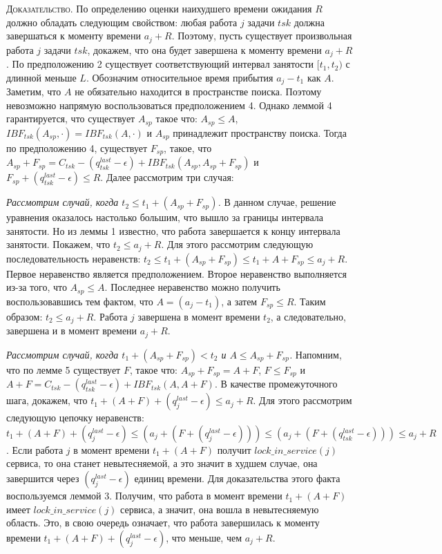 \textsc{Доказательство.}
  По определению оценки наихудшего времени ожидания $R$ должно обладать следующим свойством:
    любая работа $j$ задачи $tsk$ должна завершаться к моменту времени $a_j + R$.
  Поэтому, пусть существует произвольная работа $j$ задачи $tsk$, докажем,
    что она будет завершена к моменту времени $a_j + R$.
  По предположению 2 существует соответствующий интервал занятости $[t_1, t_2)$ с длинной меньше $L$.
  Обозначим относительное время прибытия $a_j - t_1$ как $A$. Заметим, что
  $A$ не обязательно находится в пространстве поиска. Поэтому невозможно напрямую
    воспользоваться предположением 4. Однако леммой 4 гарантируется, что
  существует $A_{sp}$ такое что: $A_{sp} \leq A$,
  $IBF_{tsk}(A_{sp},\cdot) = IBF_{tsk}(A,\cdot)$ и $A_{sp}$ принадлежит пространству поиска.
  Тогда по предположению 4, существует $F_{sp}$, такое, что
    $A_{sp} + F_{sp} = C_{tsk} - (q_{tsk}^{last} - \epsilon) + IBF_{tsk}(A_{sp}, A_{sp} + F_{sp})$ и
    $F_{sp} + (q_{tsk}^{last} - \epsilon) \leq R$. Далее рассмотрим три случая:

\textit{Рассмотрим случай, когда $t_2 \leq t_1 + (A_{sp} + F_{sp})$.}
  В данном случае, решение уравнения оказалось настолько большим, что вышло за границы
  интервала занятости. Но из леммы 1 известно, что работа завершается к концу интервала
  занятости. Покажем, что $t_2 \leq a_j + R$. Для этого рассмотрим следующую последовательность
  неравенств: $t_2 \leq t_1 + (A_{sp} + F_{sp}) \leq t_1 + A + F_{sp} \leq a_{j} + R$.
  Первое неравенство является предположением. Второе неравенство выполняется из-за того,
  что $A_{sp} \leq A$. Последнее неравенство можно получить воспользовавшись тем фактом,
  что $A = (a_{j} - t_1)$, а затем $F_{sp} \leq R$. Таким образом: $t_2 \leq a_j + R$.
  Работа $j$ завершена в момент времени $t_2$, а следовательно, завершена и в  момент времени $a_j + R$.

\textit{Рассмотрим случай, когда $t_1 + (A_{sp} + F_{sp}) < t_2$ и $A \leq A_{sp} + F_{sp}$.}
    Напомним, что по лемме 5 существует $F$, такое что: $A_{sp} + F_{sp} = A + F$, $F \leq F_{sp}$ и
      $A + F = C_{tsk} - (q_{tsk}^{last} - \epsilon) + IBF_{tsk}(A, A + F)$.
    В качестве промежуточного шага, докажем, что $t_1 + (A + F) + (q_{j}^{last} - \epsilon) \leq a_{j} + R$.
    Для этого рассмотрим следующую цепочку неравенств:
    $t_1 + (A + F) + (q_{j}^{last} - \epsilon) \leq (a_j + (F + (q_{j}^{last} - \epsilon))) \leq
      (a_j + (F + (q_{tsk}^{last} - \epsilon))) \leq a_{j} + R$.
    Если работа $j$ в момент времени $t_1 + (A + F)$ получит $lock\_in\_service(j)$ сервиса,
      то она станет невытесняемой, а это значит в худшем случае, она завершится через
      $(q_{j}^{last} - \epsilon)$ единиц времени.
    Для доказательства этого факта воспользуемся леммой 3. Получим, что работа
      в момент времени $t_1 + (A + F)$ имеет $lock\_in\_service(j)$ сервиса, а значит,
      она вошла в невытесняемую область. Это, в свою очередь означает, что работа завершилась
      к моменту времени $t_1 + (A + F) + (q_{j}^{last} - \epsilon)$, что меньше, чем $a_j + R$.

